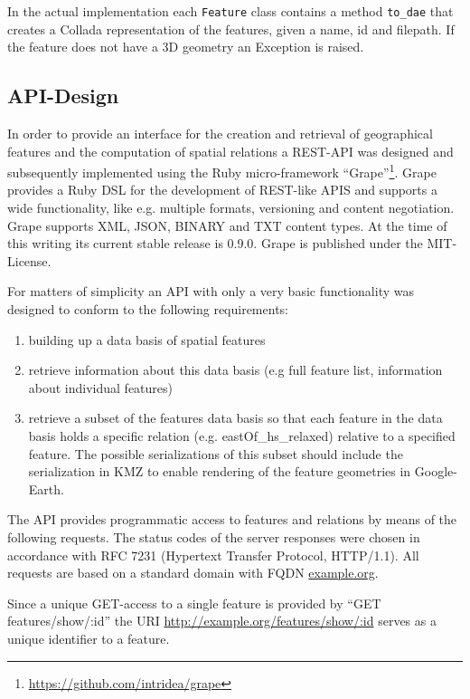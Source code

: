 \documentclass[paper=a4, fontsize=11pt]{scrartcl} %
\numberwithin{equation}{section} %
\numberwithin{figure}{section} %
\numberwithin{table}{section} %
\begin{document}
In the actual implementation each \texttt{Feature} class contains a method \texttt{to\_dae} that creates a Collada representation of the features, given a name, id and filepath. If the feature does not have a 3D geometry an Exception is raised. 



\subsection{API-Design}\label{sec:api-design}
In order to provide an interface for the creation and retrieval of geographical features and the computation of spatial relations a REST-API was designed and subsequently implemented using the Ruby micro-framework ``Grape''\footnote{\url{https://github.com/intridea/grape}}. Grape provides a Ruby DSL for the development of REST-like APIS and supports a wide functionality, like e.g. multiple formats, versioning and content negotiation. Grape supports XML, JSON, BINARY and TXT content types. At the time of this writing its current stable release is 0.9.0. Grape is published under the MIT-License. 

For matters of simplicity an API with only a very basic functionality was designed to conform to the following requirements:
\begin{enumerate}
\item building up a data basis of spatial features 
\item retrieve information about this data basis (e.g full feature list, information about individual features)
\item retrieve a subset of the features data basis so that each feature in the data basis holds a specific relation (e.g. \textrm{eastOf\_hs\_relaxed}) relative to a specified feature. The possible serializations of this subset should include the serialization in KMZ to enable rendering of the feature geometries in Google-Earth.
\end{enumerate}


The API provides programmatic access to features and relations by means of the following requests. The status codes of the server responses were chosen in accordance with RFC 7231 (Hypertext Transfer Protocol, HTTP/1.1)\cite{rfc7231}. All requests are based on a standard domain with FQDN \url{example.org}. 

Since a unique GET-access to a single feature is provided by ``\textrm{GET features/show/:id}'' the URI \url{http://example.org/features/show/:id} serves as a unique identifier to a feature.
\end{document}
